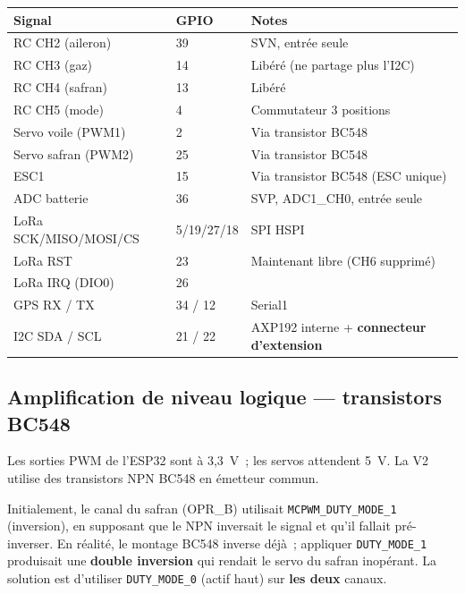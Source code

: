 \documentclass[12pt,a4paper]{article}
\begin{document}
\begin{longtable}{C{3cm} C{1.6cm} L{7.5cm}}
  \toprule
  \textcolor{tableheadfg}{\textbf{Signal}} &
  \textcolor{tableheadfg}{\textbf{GPIO}} &
  \textcolor{tableheadfg}{\textbf{Notes}} \\
  \midrule
  \endhead
  \bottomrule
  \endfoot
  RC CH2 (aileron) & 39 & SVN, entr\'ee seule \\[2pt]
  RC CH3 (gaz) & 14 & Lib\'er\'e (ne partage plus l'I2C) \\[2pt]
  RC CH4 (safran) & 13 & Lib\'er\'e \\[2pt]
  RC CH5 (mode) & 4 & Commutateur 3 positions \\[2pt]
  Servo voile (PWM1) & 2 & Via transistor BC548 \\[2pt]
  Servo safran (PWM2) & 25 & Via transistor BC548 \\[2pt]
  ESC1 & 15 & Via transistor BC548 (ESC unique) \\[2pt]
  ADC batterie & 36 & SVP, ADC1\_CH0, entr\'ee seule \\[2pt]
  LoRa SCK/MISO/MOSI/CS & 5/19/27/18 & SPI HSPI \\[2pt]
  LoRa RST & 23 & Maintenant libre (CH6 supprim\'e) \\[2pt]
  LoRa IRQ (DIO0) & 26 & \\[2pt]
  GPS RX / TX & 34 / 12 & Serial1 \\[2pt]
  I2C SDA / SCL & 21 / 22 & AXP192 interne + \textbf{connecteur d'extension} \\
\end{longtable}

\subsection{Amplification de niveau logique --- transistors BC548}
\label{subsec:bc548}

Les sorties PWM de l'ESP32 sont à 3,3~V~; les servos attendent 5~V. La V2 utilise des
transistors NPN BC548 en \'emetteur commun.

\begin{infobox}
  Initialement, le canal du safran (OPR\_B) utilisait \texttt{MCPWM\_DUTY\_MODE\_1}
  (inversion), en supposant que le NPN inversait le signal et qu'il fallait
  pr\'e-inverser. En r\'ealit\'e, le montage BC548 inverse d\'ej\`a~; appliquer
  \texttt{DUTY\_MODE\_1} produisait une \textbf{double inversion} qui rendait le servo
  du safran inop\'erant. La solution est d'utiliser \texttt{DUTY\_MODE\_0} (actif
  haut) sur \textbf{les deux} canaux.
\end{infobox}
\end{document}
